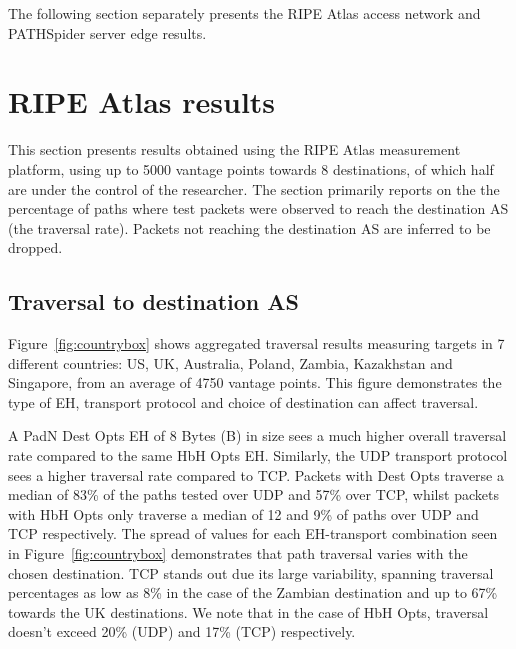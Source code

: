\documentclass[conference]{IEEEtran}
\begin{document}
The following section separately presents the RIPE Atlas access network and PATHSpider server edge results.

\section{RIPE Atlas results} 
\label{sec:ripe-results}

This section presents results obtained using the RIPE Atlas measurement platform, using up to 5000 vantage points towards 8 destinations, of which half are under the control of the researcher. The section primarily reports on the the percentage of paths where test packets were observed to reach the destination AS (the traversal rate). Packets not reaching the destination AS are inferred to be dropped. 

\subsection{Traversal to destination AS}

Figure~\ref{fig:countrybox} shows aggregated traversal results measuring targets in 7 different countries: US, UK, Australia, Poland, Zambia, Kazakhstan and Singapore, from an average of 4750 vantage points. This figure demonstrates the type of EH, transport protocol and choice of destination can affect traversal.

A PadN Dest Opts EH of 8 Bytes (B) in size sees a much higher overall traversal rate compared to the same HbH Opts EH. Similarly, the UDP transport protocol sees a higher traversal rate compared to TCP. Packets with Dest Opts traverse a median of 83\% of the paths tested over UDP and 57\% over TCP, whilst packets with HbH Opts only traverse a median of 12 and 9\% of paths over UDP and TCP respectively.
The spread of values for each EH-transport combination seen in Figure~\ref{fig:countrybox} demonstrates that path traversal varies with the chosen destination. TCP stands out due its large variability, spanning traversal percentages as low as 8\% in the case of the Zambian destination and up to 67\% towards the UK destinations. We note that in the case of HbH Opts, traversal doesn't exceed 20\% (UDP) and 17\% (TCP) respectively.
\end{document}
